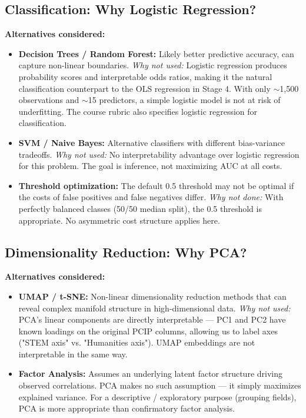 \documentclass[12pt, letterpaper]{article}
\begin{document}
\subsection{Classification: Why Logistic Regression?}

\textbf{Alternatives considered:}

\begin{itemize}
  \item \textbf{Decision Trees / Random Forest:} Likely better predictive accuracy, can capture non-linear boundaries. \textit{Why not used:} Logistic regression produces probability scores and interpretable odds ratios, making it the natural classification counterpart to the OLS regression in Stage 4. With only $\sim$1,500 observations and $\sim$15 predictors, a simple logistic model is not at risk of underfitting. The course rubric also specifies logistic regression for classification.

  \item \textbf{SVM / Naive Bayes:} Alternative classifiers with different bias-variance tradeoffs. \textit{Why not used:} No interpretability advantage over logistic regression for this problem. The goal is inference, not maximizing AUC at all costs.

  \item \textbf{Threshold optimization:} The default 0.5 threshold may not be optimal if the costs of false positives and false negatives differ. \textit{Why not done:} With perfectly balanced classes (50/50 median split), the 0.5 threshold is appropriate. No asymmetric cost structure applies here.
\end{itemize}

\subsection{Dimensionality Reduction: Why PCA?}

\textbf{Alternatives considered:}

\begin{itemize}
  \item \textbf{UMAP / t-SNE:} Non-linear dimensionality reduction methods that can reveal complex manifold structure in high-dimensional data. \textit{Why not used:} PCA's linear components are directly interpretable — PC1 and PC2 have known loadings on the original PCIP columns, allowing us to label axes ("STEM axis" vs. "Humanities axis"). UMAP embeddings are not interpretable in the same way.

  \item \textbf{Factor Analysis:} Assumes an underlying latent factor structure driving observed correlations. PCA makes no such assumption — it simply maximizes explained variance. For a descriptive / exploratory purpose (grouping fields), PCA is more appropriate than confirmatory factor analysis.
\end{itemize}
\end{document}
